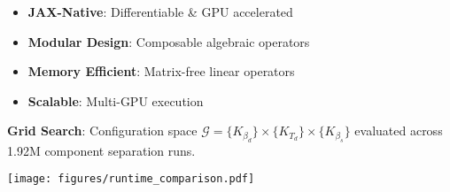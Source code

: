 \documentclass[a2paper,portrait,fontscale=0.9]{baposter}
\newcommand{\compresslist}{
	\setlength{\itemsep}{1pt}
	\setlength{\parskip}{0pt}
	\setlength{\parsep}{0pt}
}
\begin{document}
\begin{poster}
{\vspace{0.1cm}

\begin{minipage}{0.45\textwidth}
    
    \begin{itemize}[leftmargin=0.5cm] \compresslist

        \item[\ding{227}] \textbf{JAX-Native}: Differentiable \& GPU accelerated
        \item[\ding{227}] \textbf{Modular Design}: Composable algebraic operators
        \item[\ding{227}] \textbf{Memory Efficient}: Matrix-free linear operators
        \item[\ding{227}] \textbf{Scalable}: Multi-GPU execution

    \end{itemize}


    \textbf{Grid Search}: Configuration space $\mathcal{G} = \{K_{\beta_d}\} \times \{K_{T_d}\} \times \{K_{\beta_s}\}$ evaluated across 1.92M component separation runs.

    \vspace{0.3cm} %
    \texttt{[image: figures/runtime\_comparison.pdf]}

\end{minipage}
\hfill
\begin{minipage}{0.45\textwidth}
    \begin{center}
        
        
    \end{center}
    \end{minipage}    


\vspace{0.2cm}

} 



\end{poster}
\end{document}
